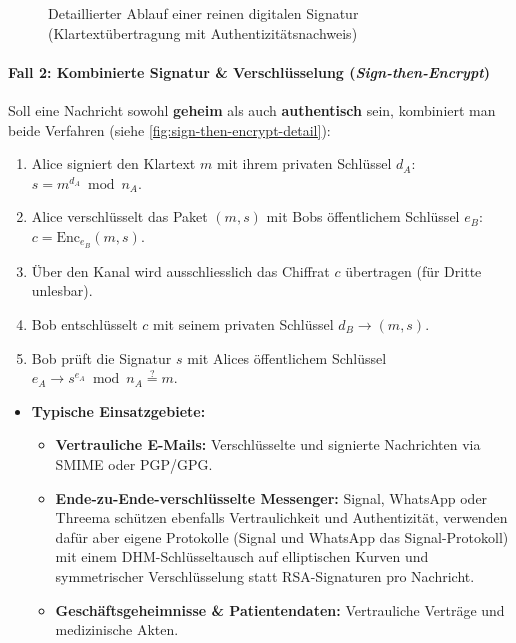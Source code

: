 \begin{figure}[H]
	\centering
	
	\caption{Detaillierter Ablauf einer reinen digitalen Signatur (Klartextübertragung mit Authentizitätsnachweis)}
	\label{fig:digital-signature-detail}
\end{figure}

\paragraph*{Fall 2: Kombinierte Signatur \& Verschlüsselung (\emph{Sign-then-Encrypt})}
Soll eine Nachricht sowohl \textbf{geheim} als auch \textbf{authentisch} sein, kombiniert man beide Verfahren (siehe \cref{fig:sign-then-encrypt-detail}):
\begin{enumerate}
	\item Alice signiert den Klartext $m$ mit ihrem privaten Schlüssel $d_A$: $s = m^{d_A} \bmod n_A$.
	\item Alice verschlüsselt das Paket $(m, s)$ mit Bobs öffentlichem Schlüssel $e_B$: $c = \text{Enc}_{e_B}(m, s)$.
	\item Über den Kanal wird ausschliesslich das Chiffrat $c$ übertragen (für Dritte unlesbar).
	\item Bob entschlüsselt $c$ mit seinem privaten Schlüssel $d_B \rightarrow (m, s)$.
	\item Bob prüft die Signatur $s$ mit Alices öffentlichem Schlüssel $e_A \rightarrow s^{e_A} \bmod n_A \stackrel{?}{=} m$.
\end{enumerate}
\begin{itemize}
	\item \textbf{Typische Einsatzgebiete:}
	      \begin{itemize}
		      \item \textbf{Vertrauliche E-Mails:} Verschlüsselte und signierte Nachrichten via \gls{SMIME} oder \gls{PGP}/\gls{GPG}.
		      \item \textbf{Ende-zu-Ende-verschlüsselte Messenger:} Signal, WhatsApp oder Threema schützen ebenfalls Vertraulichkeit und Authentizität, verwenden dafür aber eigene Protokolle (Signal und WhatsApp das Signal-Protokoll) mit einem \gls{DHM}-Schlüsseltausch auf elliptischen Kurven und symmetrischer Verschlüsselung statt \gls{RSA}-Signaturen pro Nachricht.
		      \item \textbf{Geschäftsgeheimnisse \& Patientendaten:} Vertrauliche Verträge und medizinische Akten.
	      \end{itemize}
\end{itemize}

